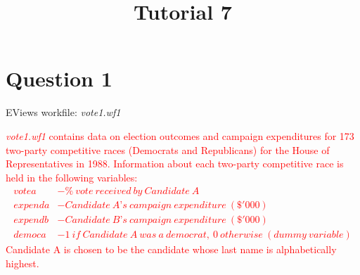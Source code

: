 \documentclass[12pt]{report}
\title{Tutorial 7}
\subtitle
{
	\textbf{keywords}: level log interpretation, dummy variables, hypothesis test, F-test, t-test, p-value, overall significance, individual significance, multiple linear restrictions, reparameterisation
	
	\textbf{estimated reading time}: 35 minutes
}
\begin{document}
	
\maketitle

\section*{Question 1}
\noindent EViews workfile: \textit{vote1.wf1}

\noindent \textcolor{red}{\textit{vote1.wf1} contains data on election outcomes and campaign expenditures for 173 two-party competitive races (Democrats and Republicans) for the House of Representatives in 1988. Information about each two-party competitive race is held in the following variables:
\begin{align*}
	votea &- \%\ vote\ received\ by\ Candidate\ A \\
	expenda &- Candidate\ A’s\ campaign\ expenditure\ (\$'000) \\
	expendb &- Candidate\ B’s\ campaign\ expenditure\ (\$'000) \\
	democa &- 1\ if\ Candidate\ A\ was\ a\ democrat,\ 0\ otherwise\ (dummy\ variable)
\end{align*}
\noindent Candidate A is chosen to be the candidate whose last name is alphabetically highest.}
\end{document}
